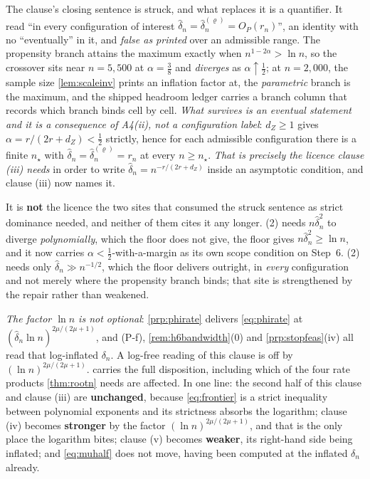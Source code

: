 \medskip
\noindent
 The clause's closing sentence is struck, and what replaces it is a quantifier. It read ``in every
configuration of interest $\hat\delta_n=\hat\delta_n^{(\varrho)}=O_P(r_n)$'', an identity with no
``eventually'' in it, and \emph{false as printed} over an admissible range. The propensity branch attains
the maximum exactly when $n^{1-2\alpha}>\ln n$, so the crossover sits near $n=5{,}500$ at
$\alpha=\tfrac38$ and \emph{diverges} as $\alpha\uparrow\tfrac12$; at $n=2{,}000$, the sample size
\cref{lem:scaleinv} prints an inflation factor at, the \emph{parametric} branch is the maximum, and the
shipped headroom ledger carries a branch column that records which branch binds cell by cell.
\emph{What survives is an eventual statement and it is a consequence of A4(ii), not a configuration
label}: $d_Z\ge1$ gives $\alpha=r/(2r+d_Z)<\tfrac12$ strictly, hence for each admissible configuration
there is a finite $n_\star$ with $\hat\delta_n=\hat\delta_n^{(\varrho)}=r_n$ at every $n\ge n_\star$.
\emph{That is precisely the licence clause \textup{(iii)} needs} in order to write
$\hat\delta_n=n^{-r/(2r+d_Z)}$ inside an asymptotic condition, and clause \textup{(iii)} now names it.

\medskip
\noindent
 It is \textbf{not} the licence the two sites that consumed the struck sentence as strict dominance
needed, and neither of them cites it any longer. \textup{(2)} needs
$n\hat\delta_n^{2}$ to diverge \emph{polynomially}, which the floor does not give, the floor gives
$n\hat\delta_n^{2}\ge\ln n$, and it now carries $\alpha<\tfrac12$-with-a-margin as its own scope
condition on Step~6. \textup{(2)} needs only $\hat\delta_n\gg n^{-1/2}$, which the
floor delivers outright, in \emph{every} configuration and not merely where the propensity branch binds;
that site is strengthened by the repair rather than weakened.

\medskip
\noindent
\emph{The factor $\ln n$ is not optional}: \cref{prp:phirate} delivers \eqref{eq:phirate} at
$(\hat\delta_n\ln n)^{2\mu/(2\mu+1)}$, and (P-f),
\cref{rem:h6bandwidth}\textup{(0)} and \cref{prp:stopfeas}\textup{(iv)} all read that log-inflated
$\delta_n$. A log-free reading of this clause is off by $(\ln n)^{2\mu/(2\mu+1)}$.
 carries the full disposition, including which of the four rate products
\cref{thm:rootn} needs are affected. In one line: the second half of this clause and clause (iii) are
\textbf{unchanged}, because \eqref{eq:frontier} is a strict inequality between polynomial exponents and its
strictness absorbs the logarithm; clause (iv) becomes \textbf{stronger} by the factor $(\ln n)^{2\mu/(2\mu+1)}$,
and that is the only place the logarithm bites; clause (v) becomes \textbf{weaker}, its right-hand side being
inflated; and \eqref{eq:muhalf} does not move, having been computed at the inflated $\delta_n$ already.


